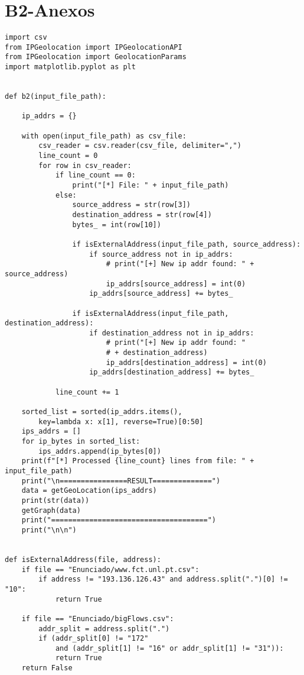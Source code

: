 \chapter{B2-Anexos}
\begin{lstlisting}
import csv
from IPGeolocation import IPGeolocationAPI
from IPGeolocation import GeolocationParams
import matplotlib.pyplot as plt


def b2(input_file_path):

    ip_addrs = {}

    with open(input_file_path) as csv_file:
        csv_reader = csv.reader(csv_file, delimiter=",")
        line_count = 0
        for row in csv_reader:
            if line_count == 0:
                print("[*] File: " + input_file_path)
            else:
                source_address = str(row[3])
                destination_address = str(row[4])
                bytes_ = int(row[10])

                if isExternalAddress(input_file_path, source_address):
                    if source_address not in ip_addrs:
                        # print("[+] New ip addr found: " + source_address)
                        ip_addrs[source_address] = int(0)
                    ip_addrs[source_address] += bytes_

                if isExternalAddress(input_file_path, destination_address):
                    if destination_address not in ip_addrs:
                        # print("[+] New ip addr found: " 
                        # + destination_address)
                        ip_addrs[destination_address] = int(0)
                    ip_addrs[destination_address] += bytes_

            line_count += 1

    sorted_list = sorted(ip_addrs.items(), 
        key=lambda x: x[1], reverse=True)[0:50]
    ips_addrs = []
    for ip_bytes in sorted_list:
        ips_addrs.append(ip_bytes[0])
    print(f"[*] Processed {line_count} lines from file: " + input_file_path)
    print("\n================RESULT==============")
    data = getGeoLocation(ips_addrs)
    print(str(data))
    getGraph(data)
    print("=====================================")
    print("\n\n")


def isExternalAddress(file, address):
    if file == "Enunciado/www.fct.unl.pt.csv":
        if address != "193.136.126.43" and address.split(".")[0] != "10":
            return True

    if file == "Enunciado/bigFlows.csv":
        addr_split = address.split(".")
        if (addr_split[0] != "172" 
            and (addr_split[1] != "16" or addr_split[1] != "31")):
            return True
    return False



\end{lstlisting}
